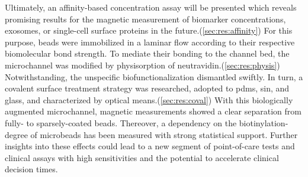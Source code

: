 Ultimately, an affinity-based concentration assay will be presented which reveals promising results for the magnetic measurement of biomarker concentrations, exosomes, or single-cell surface proteins in the future.(\cref{sec:res:affinity}) For this purpose, beads were immobilized in a laminar flow according to their respective biomolecular bond strength. To mediate their bonding to the channel bed, the microchannel was modified by physisorption of neutravidin.(\cref{sec:res:physis}) Notwithstanding, the unspecific biofunctionalization dismantled swiftly. In turn, a covalent surface treatment strategy was researched, adopted to \acrshort{pdms}, \acrshort{sin}, and glass, and characterized by optical means.(\cref{sec:res:coval}) With this biologically augmented microchannel, magnetic measurements showed a clear separation from fully- to sparsely-coated beads. Thereover, a dependency on the biotinylation-degree of microbeads has been measured with strong statistical support. Further insights into these effects could lead to a new segment of point-of-care tests and clinical assays with high sensitivities and the potential to accelerate clinical decision times.


